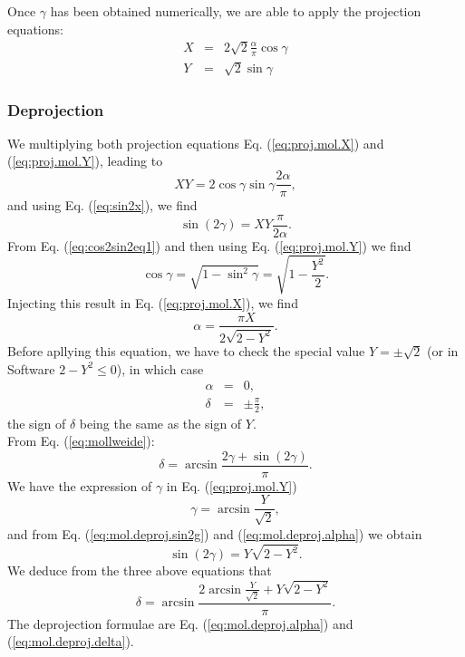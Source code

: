     Once $\gamma$ has been obtained numerically, we are able to apply the projection equations:
    \begin{eqnarray}
      X & = & 2\sqrt{2} \frac{\alpha}{\pi} \cos\gamma \label{eq:proj.mol.X}\\
      Y & = &  \sqrt{2}                    \sin\gamma \label{eq:proj.mol.Y}
    \end{eqnarray}

  \subsubsection{Deprojection}

    We multiplying both projection equations Eq. (\ref{eq:proj.mol.X}) and (\ref{eq:proj.mol.Y}),
    leading to
    \begin{equation}
      XY = 2\cos\gamma\sin\gamma\frac{2\alpha}{\pi},
    \end{equation}
    and using Eq. (\ref{eq:sin2x}), we find
    \begin{equation}
      \sin(2\gamma) = XY\frac{\pi}{2\alpha} \label{eq:mol.deproj.sin2g}.
    \end{equation}
    From Eq. (\ref{eq:cos2sin2eq1}) and then using Eq. (\ref{eq:proj.mol.Y}) we find
    \begin{equation}
      \cos\gamma = \sqrt{1-\sin^2\gamma} = \sqrt{1 - \frac{Y^2}{2}}.
    \end{equation}
    Injecting this result in Eq. (\ref{eq:proj.mol.X}), we find
    \begin{equation}
      \alpha = \frac{\pi X}{2\sqrt{2 - Y^2}}.
      \label{eq:mol.deproj.alpha}
    \end{equation}
    Before apllying this equation, we have to check the special value $Y=\pm \sqrt{2}$
    (or in Software $2 - Y^2\le 0$), in which case
    \begin{eqnarray}
       \alpha & = & 0, \\
       \delta & = & \pm\frac{\pi}{2},
    \end{eqnarray}
    the sign of $\delta$ being the same as the sign of $Y$.\\
    From Eq. (\ref{eq:mollweide}):
    \begin{equation}
      \delta = \arcsin \frac{2\gamma + \sin(2\gamma)}{\pi}.
    \end{equation} 
    We have the expression of $\gamma$ in Eq. (\ref{eq:proj.mol.Y})
    \begin{equation}
      \gamma = \arcsin\frac{Y}{\sqrt{2}},
    \end{equation}
    and from Eq. (\ref{eq:mol.deproj.sin2g}) and (\ref{eq:mol.deproj.alpha}) we obtain
    \begin{equation}
      \sin(2\gamma) = Y\sqrt{2 - Y^2}.
    \end{equation}
    We deduce from the three above equations that
    \begin{equation}
      \delta = \arcsin\frac{2\arcsin\frac{Y}{\sqrt{2}} + Y\sqrt{2 - Y^2}}
                           {\pi}.
      \label{eq:mol.deproj.delta}
    \end{equation}
    The deprojection formulae are Eq. (\ref{eq:mol.deproj.alpha}) and (\ref{eq:mol.deproj.delta}).
    

